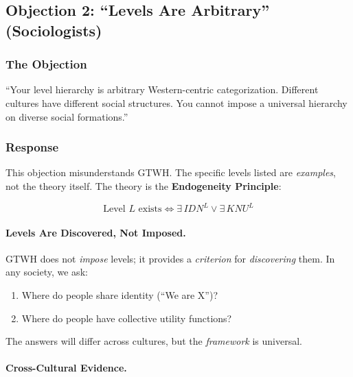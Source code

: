 \subsection{Objection 2: ``Levels Are Arbitrary'' (Sociologists)}

\subsubsection{The Objection}

\begin{tcolorbox}[colback=red!5!white, colframe=red!75!black, title=Sociologist's Objection]
``Your level hierarchy is arbitrary Western-centric categorization. Different 
cultures have different social structures. You cannot impose a universal 
hierarchy on diverse social formations.''
\end{tcolorbox}

\subsubsection{Response}

This objection misunderstands GTWH. The specific levels listed are \textit{examples}, 
not the theory itself. The theory is the \textbf{Endogeneity Principle}:

\begin{equation}
\text{Level } L \text{ exists} \iff \exists \, IDN^L \lor \exists \, KNU^L
\end{equation}

\paragraph{Levels Are Discovered, Not Imposed.}

GTWH does not \textit{impose} levels; it provides a \textit{criterion} for 
\textit{discovering} them. In any society, we ask:
\begin{enumerate}[nosep]
\item Where do people share identity (``We are X'')?
\item Where do people have collective utility functions?
\end{enumerate}

The answers will differ across cultures, but the \textit{framework} is universal.

\paragraph{Cross-Cultural Evidence.}

